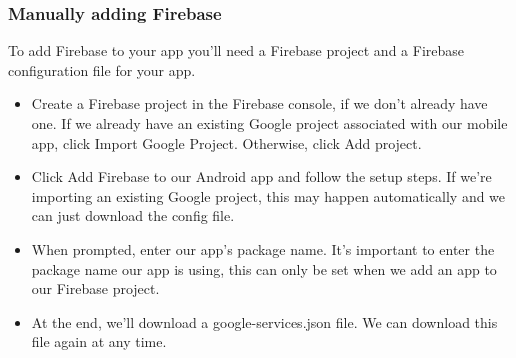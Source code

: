 		\subsubsection{Manually adding Firebase}
		To add Firebase to your app you'll need a Firebase project and a Firebase configuration file for your app.
		\begin{itemize}
			\item Create a Firebase project in the Firebase console, if we don't already have one. If we already have an existing Google project associated with our mobile app, click Import Google Project. Otherwise, click Add project.
			\item Click Add Firebase to our Android app and follow the setup steps. If we're importing an existing Google project, this may happen automatically and we can just download the config file.
			\item When prompted, enter our app's package name. It's important to enter the package name our app is using, this can only be set when we add an app to our Firebase project.
			\item At the end, we'll download a google-services.json file. We can download this file again at any time.
		\end{itemize}
